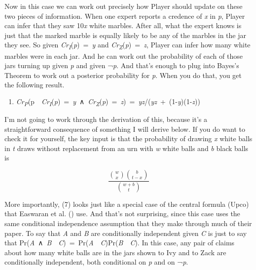 \documentclass[
  11pt,
  letterpaper,
  DIV=11,
  numbers=noendperiod,
  twoside]{scrartcl}
\providecommand{\tightlist}{%
  \setlength{\itemsep}{0pt}\setlength{\parskip}{0pt}}
\begin{document}
Now in this case we can work out precisely how Player should update on
these two pieces of information. When one expert reports a credence of
\emph{x} in \emph{p}, Player can infer that they saw 10\emph{x} white
marbles. After all, what the expert knows is just that the marked marble
is equally likely to be any of the marbles in the jar they see. So given
\emph{Cr\textsubscript{I}}(\emph{p})~=~\emph{y} and
\emph{Cr\textsubscript{Z}}(\emph{p})~=~\emph{z}, Player can infer how
many white marbles were in each jar. And he can work out the probability
of each of those jars turning up given \emph{p} and given ¬\emph{p}. And
that's enough to plug into Bayes's Theorem to work out a posterior
probability for \emph{p}. When you do that, you get the following
result.

\begin{enumerate}
\def\labelenumi{(\arabic{enumi})}
\setcounter{enumi}{6}
\tightlist
\item
  \emph{Cr\textsubscript{P}}(p~\textbar~\emph{Cr\textsubscript{I}}(\emph{p})~=~\emph{y}~∧~\emph{Cr\textsubscript{Z}}(\emph{p})~=~\emph{z})~=~\emph{yz}/(\emph{yz}~+~(1-\emph{y})(1-\emph{z}))
\end{enumerate}

I'm not going to work through the derivation of this, because it's a
straightforward consequence of something I will derive below. If you do
want to check it for yourself, the key input is that the probability of
drawing \emph{x} white balls in \emph{t} draws without replacement from
an urn with \emph{w} white balls and \emph{b} black balls is

\[
\frac{\binom{w}{x} \binom{b}{t-x}}{\binom{w+b}{t}}
\]

More importantly, (7) looks just like a special case of the central
formula (Upco) that Easwaran et al.
() use. And that's not surprising,
since this case uses the same conditional independence assumption that
they make through much of their paper. To say that \emph{A} and \emph{B}
are conditionally independent given \emph{C} is just to say that
Pr(\emph{A}~∧~\emph{B}~\textbar~\emph{C})~=~Pr(\emph{A}~\textbar~\emph{C})Pr(\emph{B}~\textbar~\emph{C}).
In this case, any pair of claims about how many white balls are in the
jars shown to Ivy and to Zack are conditionally independent, both
conditional on \emph{p} and on ¬\emph{p}.
\end{document}
